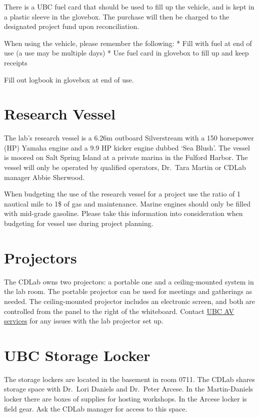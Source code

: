 \documentclass[
]{book}
\begin{document}
There is a UBC fuel card that should be used to fill up the vehicle, and is kept in a plastic sleeve in the glovebox. The purchase will then be charged to the designated project fund upon reconciliation.

When using the vehicle, please remember the following:
* Fill with fuel at end of use (a use may be multiple days)
* Use fuel card in glovebox to fill up and keep receipts

Fill out logbook in glovebox at end of use.

\hypertarget{research-vessel}{%
\section{Research Vessel}\label{research-vessel}}

The lab's research vessel is a 6.26m outboard Silverstream with a 150 horsepower (HP) Yamaha engine and a 9.9 HP kicker engine dubbed `Sea Blush'. The vessel is moored on Salt Spring Island at a private marina in the Fulford Harbor. The vessel will only be operated by qualified operators, Dr.~Tara Martin or CDLab manager Abbie Sherwood.

When budgeting the use of the research vessel for a project use the ratio of 1 nautical mile to 1\$ of gas and maintenance. Marine engines should only be filled with mid-grade gasoline. Please take this information into consideration when budgeting for vessel use during project planning.

\hypertarget{projectors}{%
\section{Projectors}\label{projectors}}

The CDLab owns two projectors: a portable one and a ceiling-mounted system in the lab room. The portable projector can be used for meetings and gatherings as needed. The ceiling-mounted projector includes an electronic screen, and both are controlled from the panel to the right of the whiteboard. Contact \href{https://it.ubc.ca/got-question-about-it-products-and-support\#avhelpdesk}{UBC AV services} for any issues with the lab projector set up.

\hypertarget{ubc-storage-locker}{%
\section{UBC Storage Locker}\label{ubc-storage-locker}}

The storage lockers are located in the basement in room 0711. The CDLab shares storage space with Dr.~Lori Daniels and Dr.~Peter Arcese. In the Martin-Daniels locker there are boxes of supplies for hosting workshops. In the Arcese locker is field gear. Ask the CDLab manager for access to this space.
\end{document}
